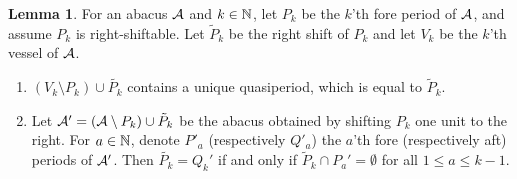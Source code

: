 \documentclass[12pt]{amsart}
\numberwithin{equation}{section}
\theoremstyle{definition}
\newtheorem{lemma}[equation]{Lemma}
\newcommand{\emp}{\emptyset}
\begin{document}
 \begin{lemma}\label{shiftsandvessels}
For an abacus $\mathcal{A}$ and $k\in\mathbb{N}$, let $P_k$ be the $k$'th fore period of $\mathcal{A}$, and assume $P_k$ is right-shiftable. 
Let $\tilde{P}_k$ be the right shift of $P_k$ and let $V_k$ be the $k$'th vessel of $\mathcal{A}$.
\begin{enumerate}
 \item $(V_k\setminus P_k)\cup \tilde{P_k}$ contains a unique quasiperiod, which is equal to $\tilde{P}_k$.
\item Let $\mathcal{A}'= (\mathcal{A}\setminus P_k) \cup \tilde{P}_k$ be the abacus obtained by shifting $P_k$ one unit to the right.
For $a\in\mathbb{N}$, denote $P'_a$ (respectively $Q'_a$) the $a$'th fore (respectively aft) periods of $\mathcal{A}'$.
Then
$\tilde{P_k}=Q_k'$ if and only if $\tilde{P}_{k}\cap P_a'=\emp$ for all $1\leq a\leq k-1$.
\end{enumerate}
\end{lemma}
\end{document}
